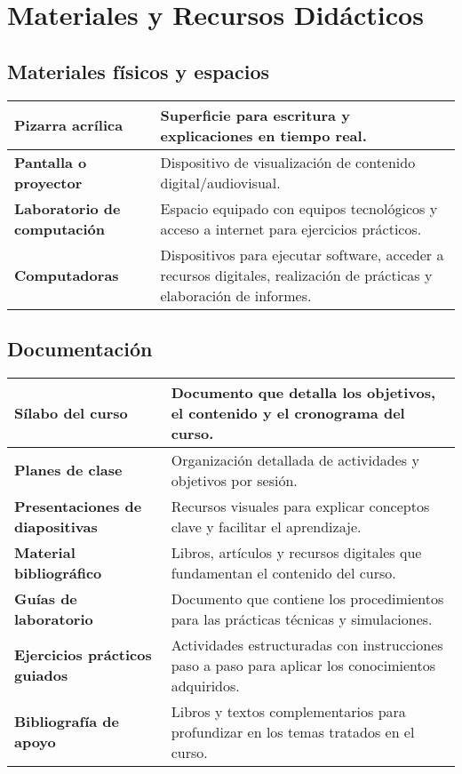 \section{Materiales y Recursos Didácticos}

\subsection*{Materiales físicos y espacios}

\begin{xltabular}{\linewidth}{@{}>{\bfseries}X X@{}}
    \toprule
    Pizarra acrílica & Superficie para escritura y explicaciones en tiempo real. \\
    \midrule
    Pantalla o proyector & Dispositivo de visualización de contenido digital/audiovisual. \\
    \midrule
    Laboratorio de computación & Espacio equipado con equipos tecnológicos y acceso a internet para ejercicios prácticos. \\
    \midrule
    Computadoras & Dispositivos para ejecutar software, acceder a recursos digitales, realización de prácticas y elaboración de informes. \\
    \bottomrule
\end{xltabular}

\subsection*{Documentación}

\begin{xltabular}{\linewidth}{@{}>{\bfseries}X X@{}}
    \toprule
    Sílabo del curso & Documento que detalla los objetivos, el contenido y el cronograma del curso. \\
    \midrule
    Planes de clase & Organización detallada de actividades y objetivos por sesión. \\
    \midrule
    Presentaciones de diapositivas & Recursos visuales para explicar conceptos clave y facilitar el aprendizaje. \\
    \midrule
    Material bibliográfico & Libros, artículos y recursos digitales que fundamentan el contenido del curso. \\
    \midrule
    Guías de laboratorio & Documento que contiene los procedimientos para las prácticas técnicas y simulaciones. \\
    \midrule
    Ejercicios prácticos guiados & Actividades estructuradas con instrucciones paso a paso para aplicar los conocimientos adquiridos. \\
    \midrule
    Bibliografía de apoyo & Libros y textos complementarios para profundizar en los temas tratados en el curso. \\
    \bottomrule
\end{xltabular}

